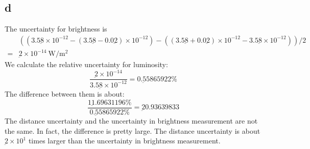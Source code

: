 \documentclass[11pt]{article}
\newcommand{\sci}[1]{\times 10^{#1}}
\begin{document}
\subsection*{d}
The uncertainty for brightness is 
$$
\begin{aligned}
&((3.5\underbar{8}\sci{-12} - (3.5\underbar{8}-0.0\underbar{2}) \sci{-12}) - ((3.5\underbar{8}+0.0\underbar{2}) \sci{-12} - 3.5\underbar{8}\sci{-12})) / 2 \\
= & \underbar{2} \sci{-14} \SI[per-mode=symbol]{}{\watt\per\meter^2}
\end{aligned}
$$
We calculate the relative uncertainty for luminosity:
$$
\frac{\underbar{2} \sci{-14}}{3.5\underbar{8}\sci{-12}} = 0.\underbar{5}5865922 \%
$$
The difference between them is about:
$$
\frac{1\underbar{1}.69631196 \%}{0.\underbar{5}5865922 \%} = \underbar{2}0.93639833
$$
The distance uncertainty and the uncertainty in brightness measurement are not the same.
 In fact, the difference is pretty large.
 The distance uncertainty is about $\underbar{2} \sci{1}$ times larger than the uncertainty in brightness measurement.
\end{document}
